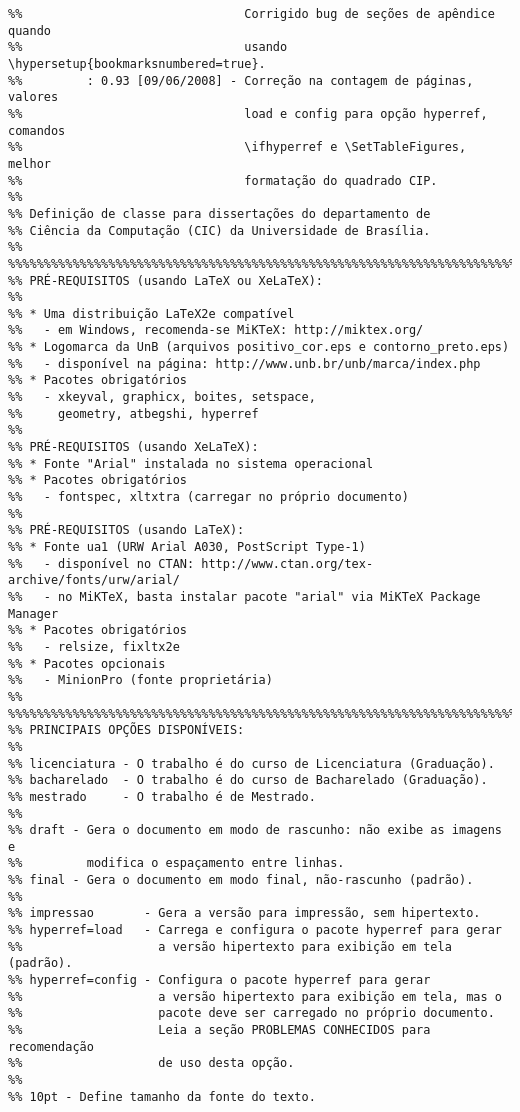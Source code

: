 \begin{verbatim}
%%                               Corrigido bug de seções de apêndice quando
%%                               usando \hypersetup{bookmarksnumbered=true}.
%%         : 0.93 [09/06/2008] - Correção na contagem de páginas, valores
%%                               load e config para opção hyperref, comandos
%%                               \ifhyperref e \SetTableFigures, melhor
%%                               formatação do quadrado CIP. 
%%
%% Definição de classe para dissertações do departamento de
%% Ciência da Computação (CIC) da Universidade de Brasília.
%%
%%%%%%%%%%%%%%%%%%%%%%%%%%%%%%%%%%%%%%%%%%%%%%%%%%%%%%%%%%%%%%%%%%%%%%%%%%%%%%%
%% PRÉ-REQUISITOS (usando LaTeX ou XeLaTeX):
%%
%% * Uma distribuição LaTeX2e compatível
%%   - em Windows, recomenda-se MiKTeX: http://miktex.org/
%% * Logomarca da UnB (arquivos positivo_cor.eps e contorno_preto.eps)
%%   - disponível na página: http://www.unb.br/unb/marca/index.php
%% * Pacotes obrigatórios
%%   - xkeyval, graphicx, boites, setspace,
%%     geometry, atbegshi, hyperref
%%
%% PRÉ-REQUISITOS (usando XeLaTeX):
%% * Fonte "Arial" instalada no sistema operacional
%% * Pacotes obrigatórios
%%   - fontspec, xltxtra (carregar no próprio documento)
%%
%% PRÉ-REQUISITOS (usando LaTeX):
%% * Fonte ua1 (URW Arial A030, PostScript Type-1)
%%   - disponível no CTAN: http://www.ctan.org/tex-archive/fonts/urw/arial/
%%   - no MiKTeX, basta instalar pacote "arial" via MiKTeX Package Manager
%% * Pacotes obrigatórios
%%   - relsize, fixltx2e
%% * Pacotes opcionais
%%   - MinionPro (fonte proprietária)
%%
%%%%%%%%%%%%%%%%%%%%%%%%%%%%%%%%%%%%%%%%%%%%%%%%%%%%%%%%%%%%%%%%%%%%%%%%%%%%%%%
%% PRINCIPAIS OPÇÕES DISPONÍVEIS:
%%
%% licenciatura - O trabalho é do curso de Licenciatura (Graduação).
%% bacharelado  - O trabalho é do curso de Bacharelado (Graduação).
%% mestrado     - O trabalho é de Mestrado.
%%
%% draft - Gera o documento em modo de rascunho: não exibe as imagens e
%%         modifica o espaçamento entre linhas.
%% final - Gera o documento em modo final, não-rascunho (padrão).
%%
%% impressao       - Gera a versão para impressão, sem hipertexto.
%% hyperref=load   - Carrega e configura o pacote hyperref para gerar
%%                   a versão hipertexto para exibição em tela (padrão).
%% hyperref=config - Configura o pacote hyperref para gerar
%%                   a versão hipertexto para exibição em tela, mas o
%%                   pacote deve ser carregado no próprio documento.
%%                   Leia a seção PROBLEMAS CONHECIDOS para recomendação
%%                   de uso desta opção.
%%
%% 10pt - Define tamanho da fonte do texto.

\end{verbatim}
